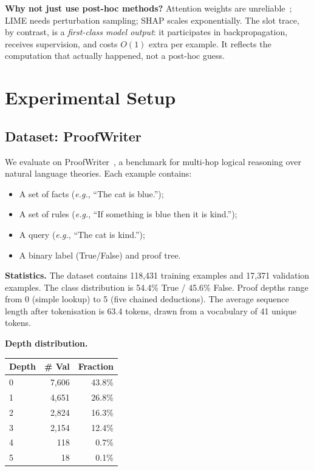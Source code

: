 \documentclass[conference]{IEEEtran}
\newcommand{\eg}{\textit{e.g.}}
\begin{document}
\textbf{Why not just use post-hoc methods?}
Attention weights are unreliable~\cite{jain2019attention}; LIME
needs perturbation sampling; SHAP scales exponentially. The slot
trace, by contrast, is a \emph{first-class model output}: it
participates in backpropagation, receives supervision, and costs
$O(1)$ extra per example. It reflects the computation that
actually happened, not a post-hoc guess.


\section{Experimental Setup}
\label{sec:experiments}

\subsection{Dataset: ProofWriter}
\label{sec:dataset}

We evaluate on ProofWriter~\cite{tafjord2021proofwriter}, a
benchmark for multi-hop logical reasoning over natural language
theories. Each example contains:
\begin{itemize}[nosep]
    \item A set of facts (\eg{}, ``The cat is blue.'');
    \item A set of rules (\eg{}, ``If something is blue then it
          is kind.'');
    \item A query (\eg{}, ``The cat is kind.'');
    \item A binary label (True/False) and proof tree.
\end{itemize}

\textbf{Statistics.} The dataset contains 118,431 training
examples and 17,371 validation examples. The class distribution
is 54.4\% True / 45.6\% False. Proof depths range from 0
(simple lookup) to 5 (five chained deductions). The average
sequence length after tokenisation is 63.4 tokens, drawn from
a vocabulary of 41 unique tokens.

\textbf{Depth distribution.}
\begin{center}
\small
\begin{tabular}{@{}lrr@{}}
\toprule
Depth & \# Val & Fraction \\
\midrule
0 & 7,606 & 43.8\% \\
1 & 4,651 & 26.8\% \\
2 & 2,824 & 16.3\% \\
3 & 2,154 & 12.4\% \\
4 & 118 & 0.7\% \\
5 & 18 & 0.1\% \\
\bottomrule
\end{tabular}
\end{center}
\end{document}

